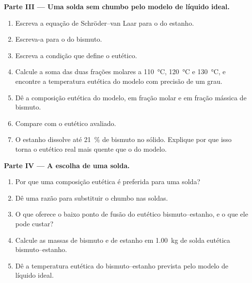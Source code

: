 \begin{problem}
\medskip
\noindent\textbf{Parte III --- Uma solda sem chumbo pelo modelo de líquido ideal.}
\begin{enumerate}[resume]
  \item Escreva a equação de Schröder--van Laar para o  do estanho.
  \item Escreva-a para o  do bismuto.
  \item Escreva a condição que define o eutético.
  \item Calcule a soma das duas frações molares a \qty{110}{\degreeCelsius},
        \qty{120}{\degreeCelsius} e \qty{130}{\degreeCelsius}, e encontre a
        temperatura eutética do modelo com precisão de um grau.
  \item Dê a composição eutética do modelo, em fração molar e em fração
        mássica de bismuto.
  \item Compare com o eutético avaliado.
  \item O estanho dissolve até 21~\% de bismuto no sólido. Explique por que
        isso torna o eutético real mais quente que o do modelo.
\end{enumerate}

\medskip
\noindent\textbf{Parte IV --- A escolha de uma solda.}
\begin{enumerate}[resume]
  \item Por que uma composição eutética é preferida para uma solda?
  \item Dê uma razão para substituir o chumbo nas soldas.
  \item O que oferece o baixo ponto de fusão do eutético bismuto--estanho, e
        o que ele pode custar?
  \item Calcule as massas de bismuto e de estanho em \qty{1.00}{kg} de
        solda eutética bismuto--estanho.
  \item Dê a temperatura eutética do bismuto--estanho prevista pelo modelo
        de líquido ideal.
\end{enumerate}
\end{problem}
